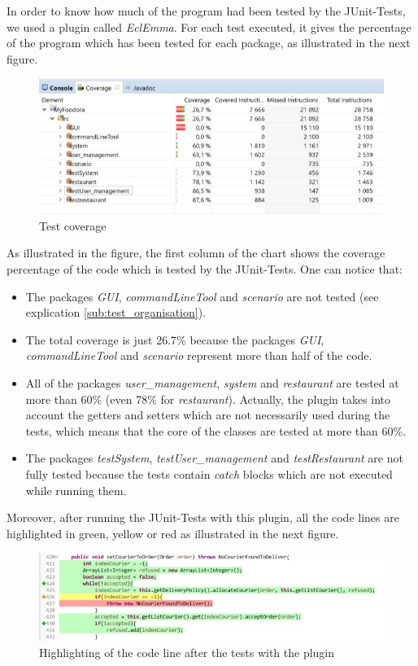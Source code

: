 In order to know how much of the program had been tested by the JUnit-Tests, we used a plugin called \textit{EclEmma}. For each test executed, it gives the percentage of the program which has been tested for each package, as illustrated in the next figure. 
\begin{figure}[H]
	\centering
	\includegraphics[width=1\linewidth]{./ima/testcoverage.jpg}
	\caption{Test coverage}
	\label{fig:test-coverage}
\end{figure}
As illustrated in the figure, the first column of the chart shows the coverage percentage of the code which is tested by the JUnit-Tests. One can notice that:
\begin{itemize}
	\item{} The packages \textit{GUI}, \textit{commandLineTool} and \textit{scenario} are not tested (see explication \ref{sub:test_organisation}).
	\item{} The total coverage is just 26.7\% because the packages \textit{GUI}, \textit{commandLineTool} and \textit{scenario} represent more than half of the code.
	\item{} All of the packages \textit{user\_management}, \textit{system} and \textit{restaurant} are tested at more than 60\% (even 78\% for \textit{restaurant}). Actually, the plugin takes into account the getters and setters which are not necessarily used during the tests, which means that the core of the classes are tested at more than 60\%.
	\item{} The packages \textit{testSystem}, \textit{testUser\_management} and \textit{testRestaurant} are not fully tested because the tests contain \textit{catch} blocks which are not executed while running them.
\end{itemize}
Moreover, after running the JUnit-Tests with this plugin, all the code lines are highlighted in green, yellow or red as illustrated in the next figure.
\begin{figure}[H]
	\centering
	\includegraphics[width=1\linewidth]{./ima/testlinecolor.jpg}
	\caption{Highlighting of the code line after the tests with the plugin}
	\label{fig:line-test-plugin}
\end{figure}

